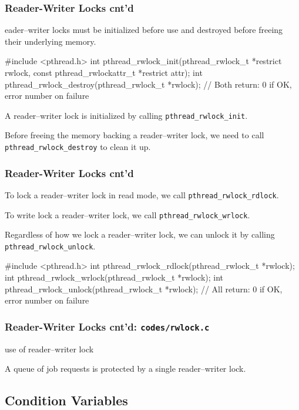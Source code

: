 \documentclass[newPxFont,sthlmFooter,nooffset]{beamer}
\begin{document}
\begin{frame}[t,fragile]
  \frametitle{Reader-Writer Locks cnt'd}
eader–writer locks must be initialized before use and destroyed before freeing their underlying memory.

\begin{codedef}
#include <pthread.h>
int pthread_rwlock_init(pthread_rwlock_t *restrict rwlock,
                        const pthread_rwlockattr_t *restrict attr);
int pthread_rwlock_destroy(pthread_rwlock_t *rwlock);
// Both return: 0 if OK, error number on failure
\end{codedef}
A reader–writer lock is initialized by calling \texttt{pthread\_rwlock\_init}.

Before freeing the memory backing a reader–writer lock, we need to call \texttt{pthread\_rwlock\_destroy} to clean it up.
\end{frame}


\begin{frame}[t, fragile]
  \frametitle{Reader-Writer Locks cnt'd}
To lock a reader–writer lock in read mode, we call \texttt{pthread\_rwlock\_rdlock}.

To write lock a reader–writer lock, we call \texttt{pthread\_rwlock\_wrlock}.

Regardless of how we lock a reader–writer lock, we can unlock it by calling \texttt{pthread\_rwlock\_unlock}.

\begin{codedef}
#include <pthread.h>
int pthread_rwlock_rdlock(pthread_rwlock_t *rwlock);
int pthread_rwlock_wrlock(pthread_rwlock_t *rwlock);
int pthread_rwlock_unlock(pthread_rwlock_t *rwlock);
// All return: 0 if OK, error number on failure
\end{codedef}
\end{frame}


\begin{frame}
  \frametitle{Reader-Writer Locks cnt'd: \texttt{codes/rwlock.c}}
use of reader–writer lock

A queue of job requests is protected by a single reader–writer lock.


\end{frame}



\subsection{Condition Variables}
\end{document}
